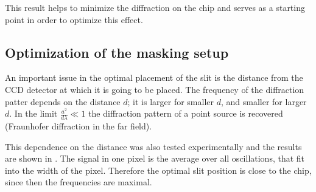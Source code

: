 This result helps to minimize the diffraction on the chip and serves as a starting point in order to optimize this effect.

\subsection{Optimization of the masking setup}
\label{subsec:slit_optim}

An important issue in the optimal placement of the slit is the distance from the CCD detector at which it is going to be placed. The frequency of the diffraction patter depends on the distance $d$; it is larger for smaller $d$, and smaller for larger $d$. In the limit $\frac{a^2}{d\lambda} \ll 1$ the diffraction pattern of a point source is recovered (Fraunhofer diffraction in the far field).

This dependence on the distance was also tested experimentally and the results are shown in .
The signal in one pixel is the average over all oscillations, that fit into the width of the pixel. Therefore the optimal slit position is close to the chip, since then the frequencies are maximal.

